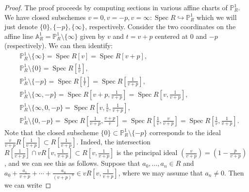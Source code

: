\documentclass[10pt,a4paper]{amsart}
\begin{document}
\begin{proof}
    The proof proceeds by computing sections in various affine charts of \(\mathbb{P}^1_{R}\).
    We have closed subschemes \(v = 0, v = -p, v = \infty : \operatorname{Spec} R \hookrightarrow \mathbb{P}^1_{R}\) which we will just denote \(\lbrace 0 \rbrace, \lbrace -p \rbrace, \lbrace \infty \rbrace\), respectively.
    Consider the two coordinates on the affine line \(\mathbb{A}^1_{R} = \mathbb{P}^1_{R} \setminus \lbrace \infty \rbrace\) given by \(v\) and \(t = v + p\) centered at \(0\) and \(-p\) (respectively).
    We can then identify: 
    \begin{align*}
        & \mathbb{P}^1_{R} \setminus \lbrace \infty \rbrace = \operatorname{Spec} R[v] = \operatorname{Spec}R[v+p] , \\
        & \mathbb{P}^1_{R} \setminus \lbrace 0 \rbrace = \operatorname{Spec}R \left[ \frac{1}{v} \right] , \\
        & \mathbb{P}^1_{R} \setminus \lbrace -p \rbrace = \operatorname{Spec} R \left[ \frac{1}{t} \right] =  \operatorname{Spec}R \left[ \frac{1}{v+p} \right] , \\
        & \mathbb{P}^1_{R} \setminus \lbrace \infty, -p \rbrace = \operatorname{Spec}R \left[ v+p, \frac{1}{v+p} \right] = \operatorname{Spec} R\left[ v, \frac{1}{v+p} \right] , \\
        & \mathbb{P}^1_{R} \setminus \lbrace \infty, 0, -p \rbrace = \operatorname{Spec} R\left[ v, \frac{1}{v}, \frac{1}{v+p} \right] , \\ 
        & \mathbb{P}^1_{R} \setminus \lbrace 0, -p \rbrace = \operatorname{Spec} R\left[ \frac{1}{v+p}, \frac{v+p}{v} \right] = \operatorname{Spec} R\left[ \frac{1}{v}, \frac{v}{v+p} \right] = \operatorname{Spec}R \left[ \frac{1}{v}, \frac{1}{v+p} \right] . 
    \end{align*}
    Note that the closed subscheme \(\lbrace 0 \rbrace \subset \mathbb{P}^1_{R} \setminus \lbrace -p \rbrace\) corresponds to the ideal \(\frac{v}{v+p}R\left[ \frac{1}{v+p}\right] \subset R \left[ \frac{1}{v+p}\right]\). 
    Indeed, the intersection \(R\left[ \frac{1}{v+p} \right] \cap v R \left[v, \frac{1}{v+p} \right] \subset R \left[v, \frac{1}{v+p} \right]\) is the principal ideal \(\left( \frac{v}{v+p} \right) = \left( 1 - \frac{p}{v+p} \right)\), 
    and we can see this as follows. 
    Suppose that \(a_{0},\dots, a_{n} \in R\) and \(a_{0} + \frac{a_{1}}{v+p} + \cdots + \frac{a_{n}}{(v+p)^n} \in v R \left[v, \frac{1}{v+p} \right]\), where we may assume that \(a_{n} \neq 0\). 
    Then we can write 

\end{proof}
\end{document}
